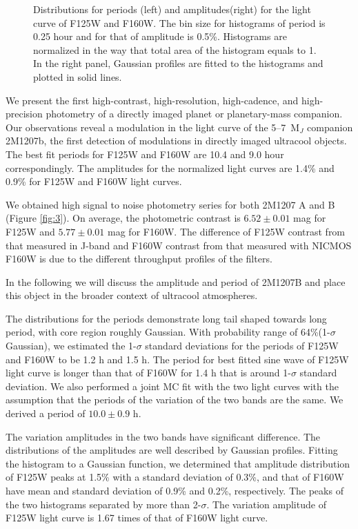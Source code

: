 \documentclass[apj]{emulateapj}
\begin{document}
\begin{figure*}
  \centering
  \caption{Distributions for periods (left) and amplitudes(right) for the light
    curve of F125W and F160W. The bin size for histograms of period is
  0.25 hour and for that of amplitude is 0.5\%. Histograms are
  normalized in the way that total area of the histogram equals to
  1. In the right panel, Gaussian profiles are fitted to the
  histograms and plotted in solid lines.}
  \label{fig:4}
\end{figure*}

\label{Results}
We present the first high-contrast, high-resolution, high-cadence, and
high-precision photometry of a directly imaged planet or
planetary-mass companion. Our observations reveal a modulation in the
light curve of the 5--7~M$_{J}$ companion 2M1207b, the first detection
of modulations in directly imaged ultracool objects.  The best fit
periods for F125W and F160W are 10.4 and 9.0 hour correspondingly. The
amplitudes for the normalized light curves are 1.4\% and 0.9\% for
F125W and F160W light curves. 

We obtained high signal to noise photometry series for both 2M1207 A
and B (Figure \ref{fig:3}). On average, the photometric contrast is
$6.52\pm0.01$ mag for
F125W and $5.77\pm0.01$ mag for F160W. The difference of F125W contrast
from that measured in J-band \citep{Mohanty2007} and
F160W contrast from that measured with NICMOS F160W 
\citep{Song2006} is due to the different throughput profiles of the
filters.

In the following we will discuss the amplitude and period of 2M1207B
and place this object in the broader context of ultracool atmospheres.

The distributions for the periods demonstrate long tail shaped towards
long period, with core region roughly Gaussian. With probability range
of 64\%(1-$\sigma$ Gaussian), we estimated the 1-$\sigma$ standard
deviations for the periods of F125W and F160W to be 1.2 h and 1.5 h. The period for best
fitted sine wave of F125W light curve is longer than that of F160W for
1.4 h that is around 1-$\sigma$ standard deviation. We also
performed a joint MC fit with the two light curves with the assumption
that the periods of the variation of the two bands are the same. We
derived a period of $10.0\pm0.9$ h. 

The variation amplitudes in the two bands have significant
difference. The distributions of the amplitudes are well described by
Gaussian profiles. Fitting the histogram to a Gaussian function, we
determined that amplitude distribution of F125W peaks at 1.5\% with a
standard deviation of 0.3\%, and that of F160W have mean and standard
deviation of 0.9\% and 0.2\%, respectively. The peaks of the two
histograms separated by more than 2-$\sigma$. The variation amplitude
of F125W light curve is 1.67 times of that of F160W light curve.
\end{document}
